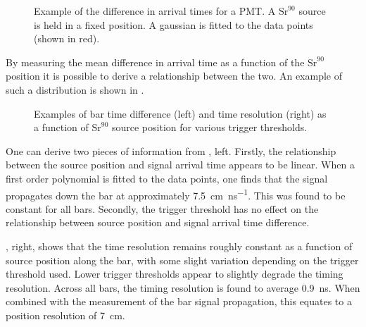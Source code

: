\begin{figure}[h]
  \begin{adjustbox}{max totalsize={.8\textwidth}, center}
    
  \end{adjustbox}
  \caption[Example of difference in signal arrival times for a PMT]{Example of the difference in arrival times for a PMT. A $\text{Sr}^{90}$ source is held in a fixed position. A gaussian is fitted to the data points (shown in red).}
  \label{fig:deltaTEx}
\end{figure}

By measuring the mean difference in arrival time as a function of the $\text{Sr}^{90}$ position it is possible to derive a relationship between the two.
An example of such a distribution is shown in .

\begin{figure}[h]
  \begin{minipage}[t]{.5\textwidth}
    \begin{adjustbox}{max totalsize={\textwidth}, center}
      
    \end{adjustbox}
  \end{minipage}
  \hfill
  \begin{minipage}[t]{.5\textwidth}
    \begin{adjustbox}{max totalsize={\textwidth}, center}
      
    \end{adjustbox}
  \end{minipage}
  \caption[Examples of bar time difference and time resolution as a function of source position]{Examples of bar time difference (left) and time resolution (right) as a function of $\text{Sr}^{90}$ source position for various trigger thresholds.}
  \label{fig:barTimeDiffRes}
\end{figure}


One can derive two pieces of information from , left.
Firstly, the relationship between the source position and signal arrival time appears to be linear.
When a first order polynomial is fitted to the data points, one finds that the signal propagates down the bar at approximately \SI{7.5}{\cm\per\nano\second}.
This was found to be constant for all bars.
Secondly, the trigger threshold has no effect on the relationship between source position and signal arrival time difference.

, right, shows that the time resolution remains roughly constant as a function of source position along the bar, with some slight variation depending on the trigger threshold used.
Lower trigger thresholds appear to slightly degrade the timing resolution.
Across all bars, the timing resolution is found to average \SI{0.9}{\nano\second}.
When combined with the measurement of the bar signal propagation, this equates to a position resolution of \SI{7}{\cm}.
